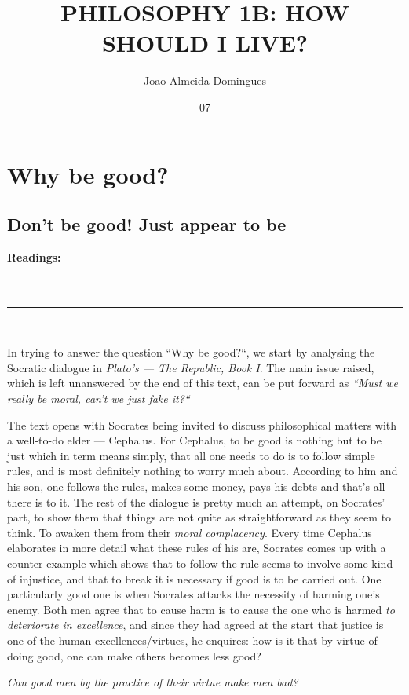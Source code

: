 \documentclass[english,course]{Notes}
\title{PHILOSOPHY 1B\@: HOW SHOULD I LIVE?}
\author{Joao Almeida-Domingues}
\date{07}{01}{2019}
\newcommand{\ita}[1]{\textit{#1}}
\newcommand\readings{\textbf{Readings:} \\}
\newcommand\sep{\\ \noindent\rule{10cm}{0.8pt} \\}
\newcommand\quo[1]{\begin{displayquote}\ita{\large{#1}}\end{displayquote}}
\begin{document}
\newpage

\section{Why be good?}

\subsection{Don't be good! Just appear to be}

\readings~\cite{Nielsen1984} \\~\cite{PlatoRepublicI}
\sep{}

\par{ In trying to answer the question ``Why be good?``, we start by analysing the Socratic dialogue in \ita{Plato's --- The Republic, Book I}. The main issue raised, which is left unanswered by the end of this text,  can be put forward as \ita{``Must we really be moral, can't we just fake it?``}}

\par{ The text opens with Socrates being invited to discuss philosophical matters with a well-to-do elder --- Cephalus. For Cephalus, to be good is nothing but to be just which in term means simply, that all one needs to do is to follow simple rules, and is most definitely nothing to worry much about. According to him and his son, one follows the rules, makes some money, pays his debts and that's all there is to it. The rest of the dialogue is pretty much an attempt, on Socrates' part,  to show them that things are not quite as straightforward as they seem to think. To awaken them from their \ita{moral complacency}. Every time Cephalus elaborates in more detail what these rules of his are, Socrates comes up with a counter example which shows that to follow the rule seems to involve some kind of injustice, and that to break it is necessary if good is to be carried out. One particularly good one is when Socrates attacks the necessity of harming one's enemy. Both men agree that to cause harm is to cause the one who is harmed \ita{to deteriorate in excellence}, and since they had agreed at the start that justice is one of the human excellences/virtues, he enquires: how is it that by virtue of doing good, one can make others becomes less good?}

\quo{Can good men by the practice of their virtue make men bad?}
\end{document}
